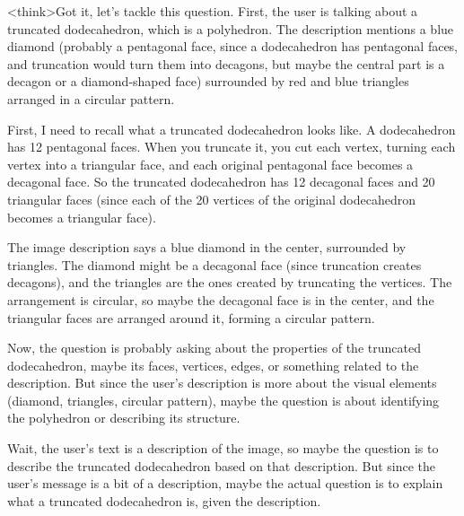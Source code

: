<think>Got it, let's tackle this question. First, the user is talking about a truncated dodecahedron, which is a polyhedron. The description mentions a blue diamond (probably a pentagonal face, since a dodecahedron has pentagonal faces, and truncation would turn them into decagons, but maybe the central part is a decagon or a diamond-shaped face) surrounded by red and blue triangles arranged in a circular pattern. 

First, I need to recall what a truncated dodecahedron looks like. A dodecahedron has 12 pentagonal faces. When you truncate it, you cut each vertex, turning each vertex into a triangular face, and each original pentagonal face becomes a decagonal face. So the truncated dodecahedron has 12 decagonal faces and 20 triangular faces (since each of the 20 vertices of the original dodecahedron becomes a triangular face). 

The image description says a blue diamond in the center, surrounded by triangles. The diamond might be a decagonal face (since truncation creates decagons), and the triangles are the ones created by truncating the vertices. The arrangement is circular, so maybe the decagonal face is in the center, and the triangular faces are arranged around it, forming a circular pattern. 

Now, the question is probably asking about the properties of the truncated dodecahedron, maybe its faces, vertices, edges, or something related to the description. But since the user's description is more about the visual elements (diamond, triangles, circular pattern), maybe the question is about identifying the polyhedron or describing its structure. 

Wait, the user's text is a description of the image, so maybe the question is to describe the truncated dodecahedron based on that description. But since the user's message is a bit of a description, maybe the actual question is to explain what a truncated dodecahedron is, given the description. 

